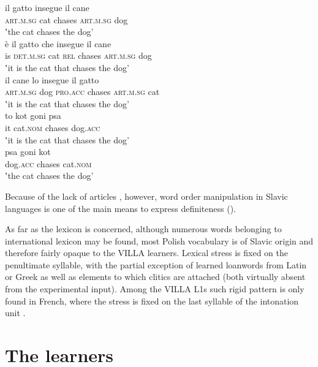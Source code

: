 \ea%
    \label{ex:02:6}
    \ea\label{ex:02:6a}
    \gll    il gatto insegue il cane\\
        \textsc{art.m.sg}  cat  chases \textsc{art.m.sg} dog\\
   \glt    ‛the cat chases the dog'\\
    \ex\label{ex:02:6b}
    \gll    è il gatto che insegue il cane\\
            is  \textsc{det.m.sg}  cat  \textsc{rel}  chases    \textsc{art.m.sg}  dog\\
\glt       ‛it is the cat that chases the dog'\\
    \ex\label{ex:02:6c}
    \gll    il cane lo insegue il gatto\\
            \textsc{art.m.sg}  dog  \textsc{pro.acc}  chases    \textsc{art.m.sg}  cat\\
   \glt    ‛it is the cat that chases the dog'\\
    \ex\label{ex:02:6d}
    \gll    to kot goni psa\\
            it  cat.\textsc{nom}  chases    dog.\textsc{acc}\\
     \glt    ‛it is the cat that chases the dog'\\
    \ex\label{ex:02:6e}
    \gll    psa goni kot\\
            dog.\textsc{acc}  chases    cat.\textsc{nom}\\
    \glt    ‛the cat chases the dog'\\
    \z
\z

Because of the lack of articles \citep{Dryer2013a}, however, word order manipulation in Slavic languages is one of the main means to express definiteness (\citealt{JacennikDryer1992, Siewierska1993}).

As far as the lexicon is concerned, although numerous words belonging to international lexicon may be found, most Polish vocabulary is of Slavic origin and therefore fairly opaque to the VILLA learners. Lexical stress is fixed on the penultimate syllable, with the partial exception of learned loanwords from Latin or Greek as well as elements to which clitics are attached (both virtually absent from the experimental input). Among the VILLA L1s such rigid pattern is only found in French, where the stress is fixed on the last syllable of the intonation unit \citep{FougeronSmith1993}. 

\section{The learners}\label{sec:02:3}

